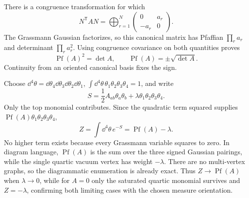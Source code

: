 \begin{enumerate}
There is a congruence transformation for which
\[
 N^{\mathsf T}AN=\bigoplus_{r=1}^N
 \begin{pmatrix}0&a_r\\-a_r&0\end{pmatrix}.
\]
The Grassmann Gaussian factorizes, so this canonical matrix has
Pfaffian \(\prod_ra_r\) and determinant \(\prod_ra_r^2\).
Using congruence covariance on both quantities proves
\[
 \operatorname{Pf}(A)^2=\det A,\qquad
 \operatorname{Pf}(A)=\pm\sqrt{\det A}.
\]
Continuity from an oriented canonical basis fixes the sign.

Choose \(\dd^4\theta=\dd\theta_4\dd\theta_3\dd\theta_2\dd\theta_1\),
\(\int \dd^4\theta\,\theta_1\theta_2\theta_3\theta_4=1\), and write
\[
 S=\frac12A_{ab}\theta_a\theta_b
 +\lambda\theta_1\theta_2\theta_3\theta_4.
\]
Only the top monomial contributes.  Since the quadratic term squared
supplies \(\operatorname{Pf}(A)\theta_1\theta_2\theta_3\theta_4\),
\[
 Z=\int \dd^4\theta\,e^{-S}
 =\operatorname{Pf}(A)-\lambda.
\]
No higher term exists because every Grassmann variable squares to zero.
In diagram language, \(\operatorname{Pf}(A)\) is the sum over the three
signed Gaussian pairings, while the single quartic vacuum vertex has
weight \(-\lambda\).  There are no multi-vertex graphs, so the diagrammatic
enumeration is already exact.
Thus \(Z\to\operatorname{Pf}(A)\) when \(\lambda\to0\), while for \(A=0\)
only the saturated quartic monomial survives and \(Z=-\lambda\), confirming
both limiting cases with the chosen measure orientation.


\end{enumerate}
